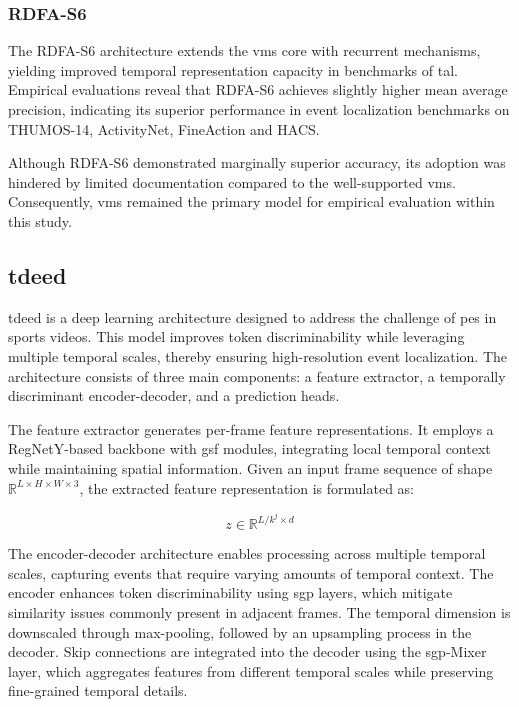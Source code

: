 \subsubsection{RDFA-S6}
The RDFA-S6 architecture extends the \acrshort{vms} core with recurrent mechanisms, yielding improved temporal representation capacity in benchmarks of \acrfull{tal}. Empirical evaluations reveal that RDFA-S6 achieves slightly higher mean average precision, indicating its superior performance in event localization benchmarks on THUMOS-14, ActivityNet, FineAction and HACS.

Although RDFA-S6 demonstrated marginally superior accuracy, its adoption was hindered by limited documentation compared to the well-supported \acrlong{vms}. Consequently, \acrshort{vms} remained the primary model for empirical evaluation within this study. 


\subsection{\acrfull{tdeed}}
\label{ssec:tdeed}

\acrfull{tdeed} is a deep learning architecture designed to address the challenge of \acrfull{pes} in sports videos. This model improves token discriminability while leveraging multiple temporal scales, thereby ensuring high-resolution event localization. The architecture consists of three main components: a feature extractor, a temporally discriminant encoder-decoder, and a prediction heads\cite{xarles_t-deed_2024}.

The feature extractor generates per-frame feature representations. It employs a RegNetY-based backbone with \acrfull{gsf} modules, integrating local temporal context while maintaining spatial information. Given an input frame sequence of shape \(\mathbb{R}^{L \times H \times W \times 3}\), the extracted feature representation is formulated as:

\[
z \in \mathbb{R}^{L/{k^j \times d} }
\]

The encoder-decoder architecture enables processing across multiple temporal scales, capturing events that require varying amounts of temporal context. The encoder enhances token discriminability using \acrfull{sgp} layers, which mitigate similarity issues commonly present in adjacent frames. The temporal dimension is downscaled through max-pooling, followed by an upsampling process in the decoder. Skip connections are integrated into the decoder using the \acrshort{sgp}-Mixer layer, which aggregates features from different temporal scales while preserving fine-grained temporal details.

